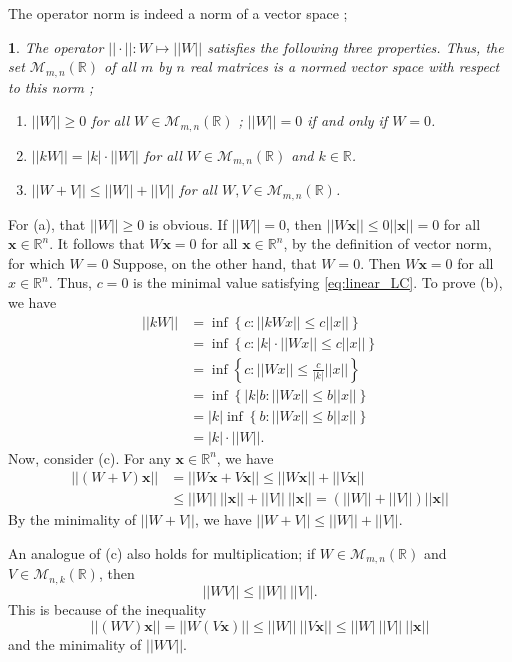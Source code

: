 \documentclass[12pt]{report}
\numberwithin{figure}{chapter}
\theoremstyle{plain}
\theoremstyle{definition}
\theoremstyle{corollary}
\theoremstyle{definition}
\theoremstyle{plain}
\newtheorem{proposition}[theorem]{\protect\propositionname}
\theoremstyle{definition}
\theoremstyle{plain}
\providecommand{\propositionname}{Proposition}
\newcommand\bx{\ensuremath{\boldsymbol x}}
\begin{document}
The operator norm is indeed a norm of a vector space ;
\begin{proposition}\label{prop:operator_norm_1}
The operator \(||\cdot||:W\mapsto||W||\) satisfies the following three properties.
Thus, the set \(\mathcal M_{m,n}(\mathbb R)\) of all \(m\) by \(n\) real matrices is a normed vector space with respect to this norm ;
\begin{enumerate}[label=(\alph*)]
\item
\(||W||\ge0\) for all \(W\in\mathcal M_{m,n}(\mathbb R)\) ; \(||W||=0\) if and only if \(W=0\).
\item
\(||kW||=|k|\cdot||W||\) for all \(W\in\mathcal M_{m,n}(\mathbb R)\) and \(k\in\mathbb R\).
\item
\(||W+V||\le||W||+||V||\) for all \(W,V\in\mathcal M_{m,n}(\mathbb R)\).
\end{enumerate}
\end{proposition}
For (a), that \(||W||\ge0\) is obvious.
If \(||W||=0\), then \(||W\bx||\le 0||\bx||=0\) for all \(\bx\in\mathbb R^n\).
It follows that \(W\bx=0\) for all \(\bx\in\mathbb R^n\), by the definition of vector norm, for which \(W=0\)
Suppose, on the other hand, that \(W=0\). Then \(W\bx=0\) for all \(x\in\mathbb R^n\).
Thus, \(c=0\) is the minimal value satisfying \eqref{eq:linear_LC}.
To prove (b), we have
\begin{align*}
||kW||
&=\inf\left\{c:||kWx||\le c||x||\right\}\\
&=\inf\left\{c:|k|\cdot||Wx||\le c||x||\right\}\\
&=\inf\left\{c:||Wx||\le\frac{c}{|k|}||x||\right\}\\
&=\inf\left\{|k|b:||Wx||\le b||x||\right\}\\
&=|k|\inf\left\{b:||Wx||\le b||x||\right\}\\
&=|k|\cdot||W||.
\end{align*}
Now, consider (c).
For any \(\bx\in\mathbb R^n\), we have
\begin{align*}
||(W+V)\bx||
&=||W\bx+V\bx||\le||W\bx||+||V\bx||\\
&\le||W||\:||\bx||+||V||\:||\bx||=(||W||+||V||)||\bx||
\end{align*}
By the minimality of \(||W+V||\), we have \(||W+V||\le||W||+||V||\).

An analogue of (c) also holds for multiplication;
if \(W\in\mathcal M_{m,n}(\mathbb R)\) and \(V\in\mathcal M_{n,k}(\mathbb R)\), then
\begin{equation}\label{eq:multiplicative_inequality}
||WV||\le||W||\:||V||.
\end{equation}
This is because of the inequality
\[||(WV)\bx||=||W(V\bx)||\le||W||\:||V\bx||\le||W|\:||V||\:||\bx||\]
and the minimality of \(||WV||\).
\end{document}
